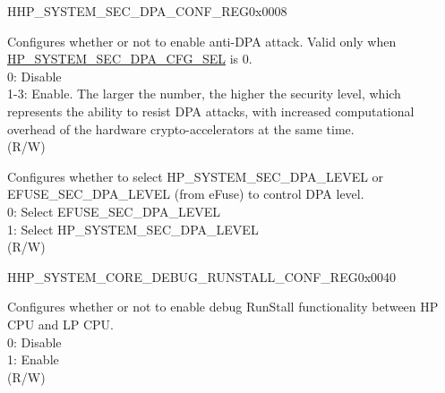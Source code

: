 \begin{register}{H}{HP\_SYSTEM\_SEC\_DPA\_CONF\_REG}{0x0008}\label{regdesc:HPSYSTEMSECDPACONFREG}
%
%
%
\regnewline%
\begin{regdesc}\begin{reglist}
\label{fielddesc:HPSYSTEMSECDPALEVEL}\item [HP\_SYSTEM\_SEC\_DPA\_LEVEL] Configures whether or not to enable anti-DPA attack. Valid only when \hyperref[fielddesc:HPSYSTEMSECDPACFGSEL]{HP\_SYSTEM\_SEC\_DPA\_CFG\_SEL} is 0. \\
0: Disable\\
1-3: Enable. The larger the number, the higher the security level, which represents the ability to resist DPA attacks, with increased computational overhead of the hardware crypto-accelerators at the same time. \\
(R/W)
\label{fielddesc:HPSYSTEMSECDPACFGSEL}\item [HP\_SYSTEM\_SEC\_DPA\_CFG\_SEL] Configures whether to select HP\_SYSTEM\_SEC\_DPA\_LEVEL or EFUSE\_SEC\_DPA\_LEVEL (from eFuse) to control DPA level. \\
0: Select EFUSE\_SEC\_DPA\_LEVEL\\
1: Select HP\_SYSTEM\_SEC\_DPA\_LEVEL\\
(R/W)
\end{reglist}\end{regdesc}
\end{register}








\begin{register}{H}{HP\_SYSTEM\_CORE\_DEBUG\_RUNSTALL\_CONF\_REG}{0x0040}\label{regdesc:HPSYSTEMCOREDEBUGRUNSTALLCONFREG}
%
%
\regnewline%
\begin{regdesc}\begin{reglist}
\label{fielddesc:HPSYSTEMCOREDEBUGRUNSTALLENABLE}\item [HP\_SYSTEM\_CORE\_DEBUG\_RUNSTALL\_ENABLE] Configures whether or not to enable debug RunStall functionality between HP CPU and LP CPU.\\
0: Disable\\
1: Enable\\
(R/W)
\end{reglist}\end{regdesc}
\end{register}


